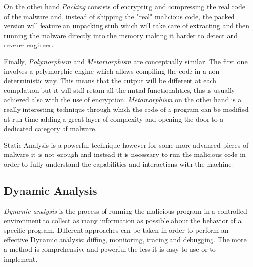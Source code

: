On the other hand \textit{Packing} consists of encrypting and compressing the real code of the malware and, instead of shipping the "real" malicious code, the packed version will feature an unpacking stub which will take care of extracting and then running the malware directly into the memory making it harder to detect and reverse engineer.

Finally, \textit{Polymorphism} and \textit{Metamorphism} are conceptually similar. The first one involves a polymorphic engine which allows compiling the code in a non-deterministic way. This means that the output will be different at each compilation but it will still retain all the initial functionalities, this is usually achieved also with the use of encryption. \textit{Metamorphism} on the other hand is a really interesting technique through which the code of a program can be modified at run-time adding a great layer of complexity and opening the door to a dedicated category of malware.

Static Analysis is a powerful technique however for some more advanced pieces of malware it is not enough and instead it is necessary to run the malicious code in order to fully understand the capabilities and interactions with the machine.

\subsection*{Dynamic Analysis}


\textit{Dynamic analysis} is the process of running the malicious program in a controlled environment to collect as many information as possible about the behavior of a specific program. Different approaches can be taken in order to perform an effective Dynamic analysis: diffing, monitoring, tracing and debugging. The more a method is comprehensive and powerful the less it is easy to use or to implement.

